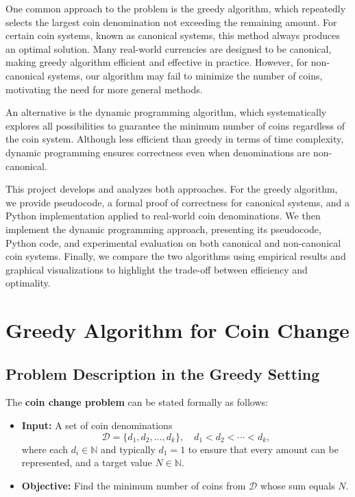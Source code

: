 \documentclass[12pt,a4paper]{report}
\begin{document}
One common approach to the problem is the greedy algorithm, which repeatedly selects the largest coin denomination not exceeding the remaining amount. For certain coin systems, known as canonical systems, this method always produces an optimal solution. Many real-world currencies are designed to be canonical, making greedy algorithm efficient and effective in practice. However, for non-canonical systems, our algorithm may fail to minimize the number of coins, motivating the need for more general methods.

An alternative is the dynamic programming algorithm, which systematically explores all possibilities to guarantee the minimum number of coins regardless of the coin system. Although less efficient than greedy in terms of time complexity, dynamic programming ensures correctness even when denominations are non-canonical.

This project develops and analyzes both approaches. For the greedy algorithm, we provide pseudocode, a formal proof of correctness for canonical systems, and a Python implementation applied to real-world coin denominations. We then implement the dynamic programming approach, presenting its pseudocode, Python code, and experimental evaluation on both canonical and non-canonical coin systems. Finally, we compare the two algorithms using empirical results and graphical visualizations to highlight the trade-off between efficiency and optimality.


\chapter{Greedy Algorithm for Coin Change\centering}
\section{Problem Description in the Greedy Setting}
\label{sec:greedy-algo}

The \textbf{coin change problem} can be stated formally as follows:

\begin{itemize}
    \item \textbf{Input:} A set of coin denominations
    \[
    \mathcal{D} = \{d_1, d_2, \dots, d_k\}, \quad d_1 < d_2 < \cdots < d_k,
    \]
    where each $d_i \in \mathbb{N}$ and typically $d_1 = 1$ to ensure that every amount can be represented, and a target value $N \in \mathbb{N}$.
    \item \textbf{Objective:} Find the minimum number of coins from $\mathcal{D}$ whose sum equals $N$.
\end{itemize}
\end{document}
